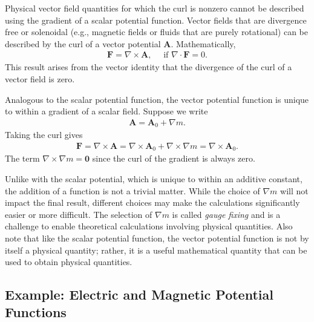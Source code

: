 Physical vector field quantities for which the curl is nonzero cannot be described using the gradient of a scalar potential function. Vector fields that are divergence free or solenoidal (e.g., magnetic fields or fluids that are purely rotational) can be described by the curl of a vector potential $\mathbf{A}$. Mathematically,
\begin{align}
  \mathbf{F} = \nabla \times \mathbf{A}, \quad \text{ if } \nabla \cdot \mathbf{F} = 0.
\end{align}
This result arises from the vector identity that the divergence of the curl of a vector field is zero.

Analogous to the scalar potential function, the vector potential function is unique to within a gradient of a scalar field. Suppose we write
\begin{align}
  \mathbf{A} = \mathbf{A}_0 + \nabla m .
\end{align} 
Taking the curl gives
\begin{align}
  \mathbf{F} = \nabla \times \mathbf{A} = \nabla \times \mathbf{A}_0 + \nabla \times \nabla m = \nabla \times \mathbf{A}_0 .
\end{align}
The term $\nabla \times \nabla m = \mathbf{0}$ since the curl of the gradient is always zero.

Unlike with the scalar potential, which is unique to within an additive constant, the addition of a function is not a trivial matter. While the choice of $\nabla m$ will not impact the final result, different choices may make the calculations significantly easier or more difficult. The selection of $\nabla m$ is called \emph{gauge fixing} and is a challenge to enable theoretical calculations involving physical quantities. Also note that like the scalar potential function, the vector potential function is not by itself a physical quantity; rather, it is a useful mathematical quantity that can be used to obtain physical quantities.

\subsection{Example: Electric and Magnetic Potential Functions}

